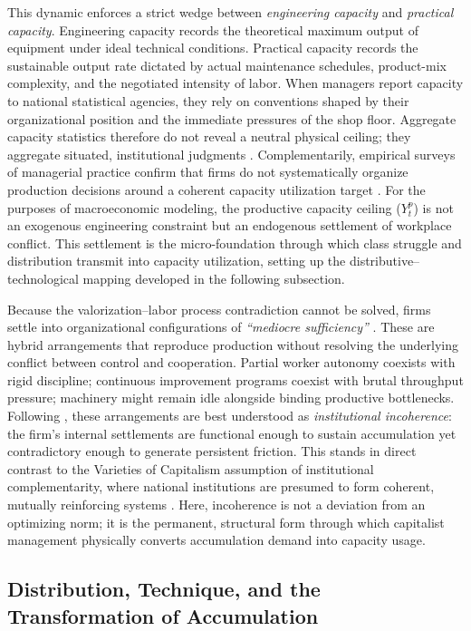 This dynamic enforces a strict wedge between
\textit{engineering capacity} and \textit{practical capacity}.
Engineering capacity records the theoretical maximum output of
equipment under ideal technical conditions. Practical capacity
records the sustainable output rate dictated by actual
maintenance schedules, product-mix complexity, and the negotiated
intensity of labor. When managers report capacity to national
statistical agencies, they rely on conventions shaped by their
organizational position and the immediate pressures of the shop
floor. Aggregate capacity statistics therefore do not reveal a
neutral physical ceiling; they aggregate situated, institutional
judgments \citep{Shaikh2016, Nikiforos2016}. Complementarily,
empirical surveys of managerial practice confirm that firms do
not systematically organize production decisions around a
coherent capacity utilization target \citep{Singh2022}. For the
purposes of macroeconomic modeling, the productive capacity
ceiling ($Y^p_t$) is not an exogenous engineering constraint but
an endogenous settlement of workplace conflict. This settlement
is the micro-foundation through which class struggle and
distribution transmit into capacity utilization, setting up the
distributive--technological mapping developed in the following
subsection.

Because the valorization--labor process contradiction cannot be
solved, firms settle into organizational configurations of
\textit{``mediocre sufficiency''} \citep{Vidal2022}. These are hybrid
arrangements that reproduce production without resolving the
underlying conflict between control and cooperation. Partial
worker autonomy coexists with rigid discipline; continuous
improvement programs coexist with brutal throughput pressure;
machinery might remain idle alongside binding productive bottlenecks. Following
\citet{Vidal2014}, these arrangements are best understood as
\textit{institutional incoherence}: the firm's internal
settlements are functional enough to sustain accumulation yet
contradictory enough to generate persistent friction. This stands
in direct contrast to the Varieties of Capitalism assumption of
institutional complementarity, where national institutions are
presumed to form coherent, mutually reinforcing systems \citep{Hall2003}. Here,
incoherence is not a deviation from an optimizing norm; it is the
permanent, structural form through which capitalist management
physically converts accumulation demand into capacity usage. 

\subsection{Distribution, Technique, and the Transformation
	of Accumulation}


